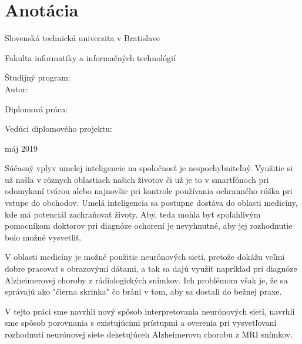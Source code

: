 
\thispagestyle{empty}
\section*{Anotácia}

\begin{minipage}[t]{1\columnwidth}%
Slovenská technická univerzita v Bratislave

Fakulta informatiky a informačných technológií

Študijný program: \myStudyProgram\\

Autor: \myName

Diplomová práca: \myTitle

Vedúci diplomového projektu: \mySupervisor

máj 2019
\end{minipage}

\bigskip{}

Súčasný vplyv umelej inteligencie na spoločnosť je nespochybniteľný. Využitie si už našla v rôznych oblastiach našich životov či už je to v smartfónoch pri odomykaní tvárou alebo najnovšie pri kontrole používania ochranného rúška pri vstupe do obchodov. Umelá inteligencia sa postupne dostáva do oblasti medicíny, kde má potenciál zachraňovať životy. Aby, teda mohla byť spoľahlivým pomocníkom doktorov pri diagnóze ochorení je nevyhnutné, aby jej rozhodnutie bolo možné vysvetliť. 

V oblasti medicíny je možné použitie neurónových sietí, pretože dokážu veľmi dobre pracovať s obrazovými dátami, a tak sa dajú využiť napríklad pri diagnóze Alzheimerovej choroby z rádiologických snímkov. Ich problémom však je, že sa správajú ako "čierna skrinka" čo bráni v tom, aby sa dostali do bežnej praxe.

V tejto práci sme navrhli nový spôsob interpretovania neurónových sietí, navrhli sme spôsob porovnania s existujúcimi prístupmi a overenia pri vysvetľovaní rozhodnutí neurónovej siete deketujúceh Alzheimerovu chorobu z MRI snímkov.

\newpage
\thispagestyle{empty}
\mbox{}
\newpage